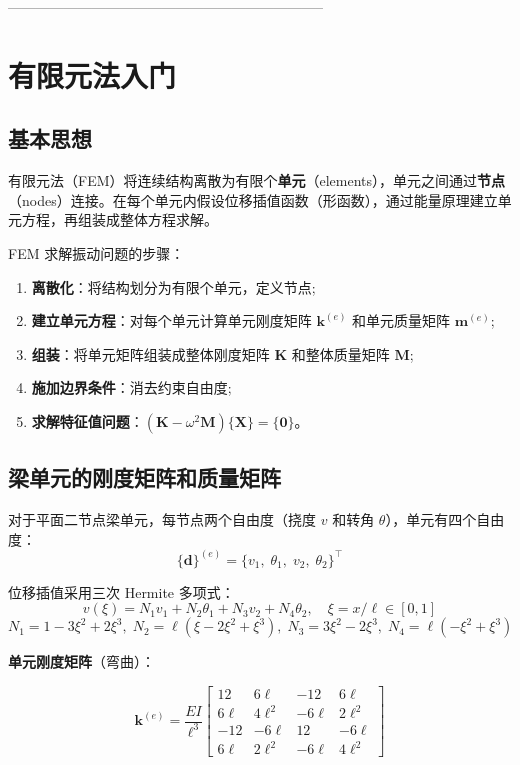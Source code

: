 --------------------------------------------------------------------
\section{有限元法入门}

\subsection{基本思想}

有限元法（FEM）将连续结构离散为有限个\textbf{单元}（elements），单元之间通过\textbf{节点}（nodes）连接。在每个单元内假设位移插值函数（形函数），通过能量原理建立单元方程，再组装成整体方程求解。

FEM 求解振动问题的步骤：
\begin{enumerate}
    \item \textbf{离散化}：将结构划分为有限个单元，定义节点;
    \item \textbf{建立单元方程}：对每个单元计算单元刚度矩阵 $\mathbf{k}^{(e)}$ 和单元质量矩阵 $\mathbf{m}^{(e)}$;
    \item \textbf{组装}：将单元矩阵组装成整体刚度矩阵 $\mathbf{K}$ 和整体质量矩阵 $\mathbf{M}$;
    \item \textbf{施加边界条件}：消去约束自由度;
    \item \textbf{求解特征值问题}：$(\mathbf{K} - \omega^2\mathbf{M})\{\mathbf{X}\} = \{\mathbf{0}\}$。
\end{enumerate}

\subsection{梁单元的刚度矩阵和质量矩阵}

对于平面二节点梁单元，每节点两个自由度（挠度 $v$ 和转角 $\theta$），单元有四个自由度：
\[
\{\mathbf{d}\}^{(e)} = \{v_1,\; \theta_1,\; v_2,\; \theta_2\}^{\top}
\]

位移插值采用三次 Hermite 多项式：
\[
v(\xi) = N_1 v_1 + N_2\theta_1 + N_3 v_2 + N_4\theta_2, \quad \xi = x/\ell \in [0,1]
\]
\[
N_1 = 1-3\xi^2+2\xi^3,\; N_2 = \ell(\xi-2\xi^2+\xi^3),\; N_3 = 3\xi^2-2\xi^3,\; N_4 = \ell(-\xi^2+\xi^3)
\]

\textbf{单元刚度矩阵}（弯曲）：
\begin{myformula}
\[
\mathbf{k}^{(e)} = \frac{EI}{\ell^3}\begin{bmatrix}
12 & 6\ell & -12 & 6\ell \\
6\ell & 4\ell^2 & -6\ell & 2\ell^2 \\
-12 & -6\ell & 12 & -6\ell \\
6\ell & 2\ell^2 & -6\ell & 4\ell^2
\end{bmatrix}
\]
\end{myformula}

